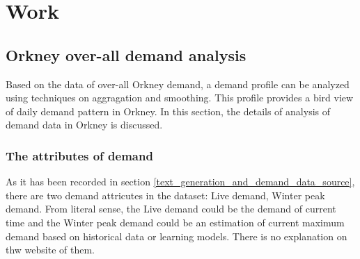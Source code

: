 \documentclass[12pt,a4paper]{report}
\begin{document}
        



    \chapter{Work}
        \section{Orkney over-all demand analysis}
        Based on the data of over-all Orkney demand, a demand profile can be analyzed using techniques on aggragation and smoothing. This profile provides a bird view of daily demand pattern in Orkney.
        In this section, the details of analysis of demand data in Orkney is discussed.

                \subsection{The attributes of demand}
                \label{text_attributs_of_demand}
                As it has been recorded in section \ref{text_generation_and_demand_data_source}, there are two demand attricutes in the dataset: Live demand, Winter peak demand. From literal sense, the 
                Live demand could be the demand of current time and the Winter peak demand could be an estimation of current maximum demand based on historical data or learning models. There is no explanation
                on thw website of them.
                
\end{document}
